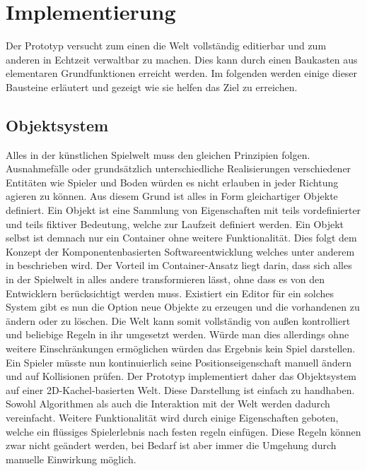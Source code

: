\chapter{Implementierung}
\label{implementation}

Der Prototyp versucht zum einen die Welt vollständig editierbar und zum anderen in Echtzeit verwaltbar zu machen. Dies kann durch einen Baukasten aus elementaren Grundfunktionen erreicht werden. Im folgenden werden einige dieser Bausteine erläutert und gezeigt wie sie helfen das Ziel zu erreichen.

\section{Objektsystem}
\label{sec:Objektsystem}
Alles in der künstlichen Spielwelt muss den gleichen Prinzipien folgen. Ausnahmefälle oder grundsätzlich unterschiedliche Realisierungen verschiedener Entitäten wie Spieler und Boden würden es nicht erlauben in jeder Richtung agieren zu können. Aus diesem Grund ist alles in Form gleichartiger Objekte definiert. Ein Objekt ist eine Sammlung von Eigenschaften mit teils vordefinierter und teils fiktiver Bedeutung, welche zur Laufzeit definiert werden. Ein Objekt selbst ist demnach nur ein Container ohne weitere Funktionalität. Dies folgt dem Konzept der Komponentenbasierten Softwareentwicklung welches unter anderem in \cite{CBSE} beschrieben wird.\newline
Der Vorteil im Container-Ansatz liegt darin, dass sich alles in der Spielwelt in alles andere transformieren lässt, ohne dass es von den Entwicklern berücksichtigt werden muss.\newline
Existiert ein Editor für ein solches System gibt es nun die Option neue Objekte zu erzeugen und die vorhandenen zu ändern oder zu löschen. Die Welt kann somit vollständig von außen kontrolliert und beliebige Regeln in ihr umgesetzt werden. Würde man dies allerdings ohne weitere Einschränkungen ermöglichen würden das Ergebnis kein Spiel darstellen. Ein Spieler müsste nun kontinuierlich seine Positionseigenschaft manuell ändern und auf Kollisionen prüfen.\newline
Der Prototyp implementiert daher das Objektsystem auf einer 2D-Kachel-basierten Welt. Diese Darstellung ist einfach zu handhaben. Sowohl Algorithmen als auch die Interaktion mit der Welt werden dadurch vereinfacht. Weitere Funktionalität wird durch einige Eigenschaften geboten, welche ein flüssiges Spielerlebnis nach festen regeln einfügen. Diese Regeln können zwar nicht geändert werden, bei Bedarf ist aber immer die Umgehung durch manuelle Einwirkung möglich.\newline


